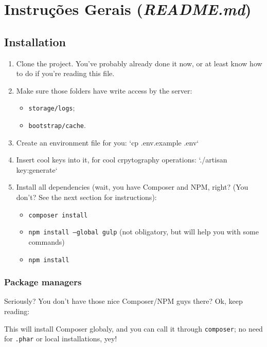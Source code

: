 \documentclass[12pt,a4paper,twoside,hyphens,english,brazil]{abntex2}
\begin{document}
{%
\section{Instruções Gerais (\emph{README.md})}

\begin{otherlanguage}{english}
\subsection{Installation}
\begin{enumerate}[itemsep=-1ex]
	\item Clone the project. You've probably already done it now, or at least know how to do if you're reading this file.
	\item Make sure those folders have write access by the server:
		\begin{itemize}[itemsep=-1ex,topsep=-1ex]
			\item \texttt{storage/logs};
			\item \texttt{bootstrap/cache}.
		\end{itemize}
	\item Create an environment file for you: `cp .env.example .env`
	\item Insert cool keys into it, for cool crpytography operations: `./artisan key:generate`
	\item Install all dependencies (wait, you have Composer and NPM, right? (You don't? See the next section for instructions):
		\begin{itemize}[itemsep=-1ex,topsep=-1ex]
			\item \texttt{composer install}
			\item \texttt{npm install --global gulp} (not obligatory, but will help you with some commands)
			\item \texttt{npm install}
		\end{itemize}
\end{enumerate}

\subsubsection{Package managers}
Seriously? You don't have those nice Composer/NPM guys there? Ok, keep reading:

This will install Composer globaly, and you can call it through \texttt{composer}; no need for \texttt{.phar} or local installations, yey!


\end{otherlanguage}}
\end{document}
